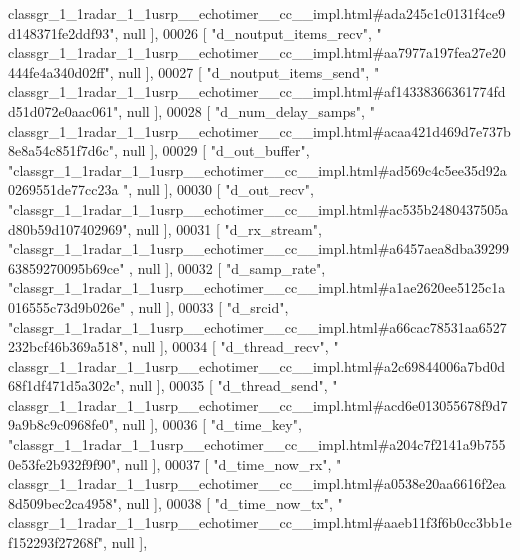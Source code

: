 \begin{DoxyCode}
{      classgr\_1\_1radar\_1\_1usrp\_\_echotimer\_\_cc\_\_impl.html#ada245c1c0131f4ce9d148371fe2ddf93"}, null ],
00026     [ \textcolor{stringliteral}{"d\_noutput\_items\_recv"}, \textcolor{stringliteral}{"
      classgr\_1\_1radar\_1\_1usrp\_\_echotimer\_\_cc\_\_impl.html#aa7977a197fea27e20444fe4a340d02ff"}, null ],
00027     [ \textcolor{stringliteral}{"d\_noutput\_items\_send"}, \textcolor{stringliteral}{"
      classgr\_1\_1radar\_1\_1usrp\_\_echotimer\_\_cc\_\_impl.html#af14338366361774fdd51d072e0aac061"}, null ],
00028     [ \textcolor{stringliteral}{"d\_num\_delay\_samps"}, \textcolor{stringliteral}{"
      classgr\_1\_1radar\_1\_1usrp\_\_echotimer\_\_cc\_\_impl.html#acaa421d469d7e737b8e8a54c851f7d6c"}, null ],
00029     [ \textcolor{stringliteral}{"d\_out\_buffer"}, \textcolor{stringliteral}{"classgr\_1\_1radar\_1\_1usrp\_\_echotimer\_\_cc\_\_impl.html#ad569c4c5ee35d92a0269551de77cc23a
      "}, null ],
00030     [ \textcolor{stringliteral}{"d\_out\_recv"}, \textcolor{stringliteral}{"classgr\_1\_1radar\_1\_1usrp\_\_echotimer\_\_cc\_\_impl.html#ac535b2480437505ad80b59d107402969"},
       null ],
00031     [ \textcolor{stringliteral}{"d\_rx\_stream"}, \textcolor{stringliteral}{"classgr\_1\_1radar\_1\_1usrp\_\_echotimer\_\_cc\_\_impl.html#a6457aea8dba3929963859270095b69ce"}
      , null ],
00032     [ \textcolor{stringliteral}{"d\_samp\_rate"}, \textcolor{stringliteral}{"classgr\_1\_1radar\_1\_1usrp\_\_echotimer\_\_cc\_\_impl.html#a1ae2620ee5125c1a016555c73d9b026e"}
      , null ],
00033     [ \textcolor{stringliteral}{"d\_srcid"}, \textcolor{stringliteral}{"classgr\_1\_1radar\_1\_1usrp\_\_echotimer\_\_cc\_\_impl.html#a66cac78531aa6527232bcf46b369a518"}, 
      null ],
00034     [ \textcolor{stringliteral}{"d\_thread\_recv"}, \textcolor{stringliteral}{"
      classgr\_1\_1radar\_1\_1usrp\_\_echotimer\_\_cc\_\_impl.html#a2c69844006a7bd0d68f1df471d5a302c"}, null ],
00035     [ \textcolor{stringliteral}{"d\_thread\_send"}, \textcolor{stringliteral}{"
      classgr\_1\_1radar\_1\_1usrp\_\_echotimer\_\_cc\_\_impl.html#acd6e013055678f9d79a9b8c9c0968fe0"}, null ],
00036     [ \textcolor{stringliteral}{"d\_time\_key"}, \textcolor{stringliteral}{"classgr\_1\_1radar\_1\_1usrp\_\_echotimer\_\_cc\_\_impl.html#a204c7f2141a9b7550e53fe2b932f9f90"},
       null ],
00037     [ \textcolor{stringliteral}{"d\_time\_now\_rx"}, \textcolor{stringliteral}{"
      classgr\_1\_1radar\_1\_1usrp\_\_echotimer\_\_cc\_\_impl.html#a0538e20aa6616f2ea8d509bec2ca4958"}, null ],
00038     [ \textcolor{stringliteral}{"d\_time\_now\_tx"}, \textcolor{stringliteral}{"
      classgr\_1\_1radar\_1\_1usrp\_\_echotimer\_\_cc\_\_impl.html#aaeb11f3f6b0cc3bb1ef152293f27268f"}, null ],

\end{DoxyCode}
